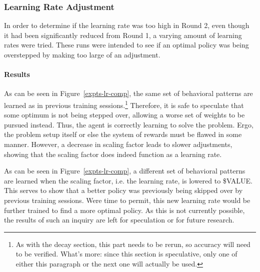 
\subsubsection*{Learning Rate Adjustment}
\label{sec:findings-expts-learnrate}

In order to determine if the learning rate was too high in Round 2,
even though it had been significantly reduced from Round 1,
a varying amount of learning rates were tried.
%
These runs were intended to see if an optimal policy was being overstepped by
making too large of an adjustment.


\paragraph*{Results}




As can be seen in Figure~\ref{expts-lr-comp},
the same set of behavioral patterns are learned as in previous training
sessions.\footnote{
	As with the decay section,
	this part needs to be rerun,
	so accuracy will need to be verified.
	What's more: since this section is speculative,
	only one of either this paragraph or the next one will actually be used.
}
%
Therefore,
it is safe to speculate that some optimum is not being stepped over,
allowing a worse set of weights to be pursued instead.
%
Thus,
the agent is correctly learning to solve the problem.
%
Ergo,
the problem setup itself or else the system of rewards
must be flawed in some manner.
%
However,
a decrease in scaling factor leads to slower adjustments,
showing that the scaling factor does indeed function as a learning rate.


As can be seen in Figure~\ref{expts-lr-comp},
a different set of behavioral patterns are learned when the
scaling factor,
i.e. the learning rate,
is lowered to \${VALUE}. %
%
This serves to show that a better policy was previously being skipped over
by previous training sessions.
%
Were time to permit,
this new learning rate would be further trained to find a more optimal
policy.
%
As this is not currently possible,
the results of such an inquiry are left for speculation
or for future research.




